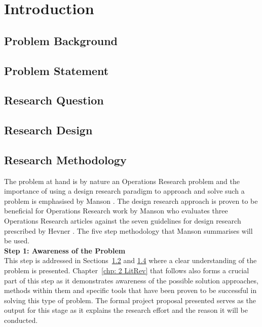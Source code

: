 \documentclass[a4paper,11pt,fleqn]{report}
\begin{document}
\newpage

\chapter{Introduction}		\label{chp: 1 Intro}
\section{Problem Background} \label{sec: Problem Background}

\section{Problem Statement} \label{sec: Problem Statement}


\section{Research Question} \label{sec: rschQuesion}


\section{Research Design}	   \label{sec: rschDesign}


\section{Research Methodology}	\label{sec: rschMeth}
The problem at hand is by nature an Operations Research problem and the importance of using a design research paradigm to approach and solve such a problem is emphasised by Manson \citep{manson2006}. The design research approach is proven to be beneficial for Operations Research work by Manson \citep{manson2006} who evaluates three Operations Research articles against the seven guidelines for design research prescribed by Hevner \citep{von2004}. The five step methodology that Manson \citep{manson2006} summarises will be used.\\

\textbf{Step 1: Awareness of the Problem}\\
This step is addressed in Sections~\ref{sec: Problem Statement} and \ref{sec: rschDesign} where a clear understanding of the problem is presented. Chapter~\ref{chp: 2 LitRev} that follows also forms a crucial part of this step as it demonstrates awareness of the possible solution approaches, methods within them and specific tools that have been proven to be successful in solving this type of problem. The formal project proposal presented serves as the output for this stage as it explains the research effort and the reason it will be conducted.\\
\end{document}

